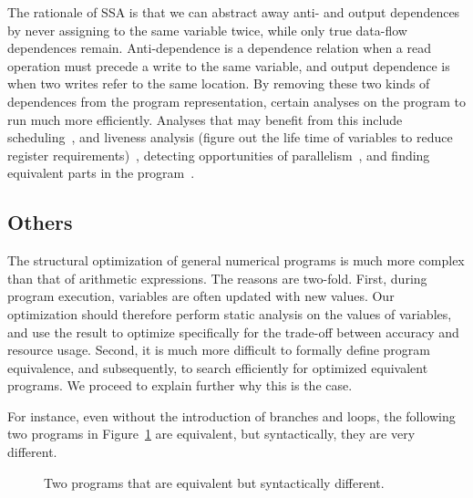 The rationale of SSA is that we can abstract away anti- and output dependences
by never assigning to the same variable twice, while only true data-flow
dependences remain.  Anti-dependence is a dependence relation when a read
operation must precede a write to the same variable, and output dependence is
when two writes refer to the same location.  By removing these two kinds of
dependences from the program representation, certain analyses on the program
to run much more efficiently.  Analyses that may benefit from this include
scheduling~\cite{rau94}, and liveness analysis (figure out the life time
of variables to reduce register requirements)~\cite{cytron91}, detecting
opportunities of parallelism~\cite{cytron87}, and finding equivalent parts in
the program~\cite{alpern88}.


\subsection{Others}

The structural optimization of general numerical programs is much more complex
than that of arithmetic expressions.  The reasons are two-fold.  First,
during program execution, variables are often updated with new values.  Our
optimization should therefore perform static analysis on the values of
variables, and use the result to optimize specifically for the trade-off
between accuracy and resource usage.  Second, it is much more difficult to
formally define program equivalence, and subsequently, to search efficiently
for optimized equivalent programs.  We proceed to explain further why this is
the case.

For instance, even without the introduction of branches and loops, the
following two programs in Figure~\ref{bg:fig:equiv_progs} are equivalent, but
syntactically, they are very different.
\begin{figure}[ht]
    \centering
     \qquad \qquad
    \caption{%
        Two programs that are equivalent but syntactically different.
    }\label{bg:fig:equiv_progs}
\end{figure}

